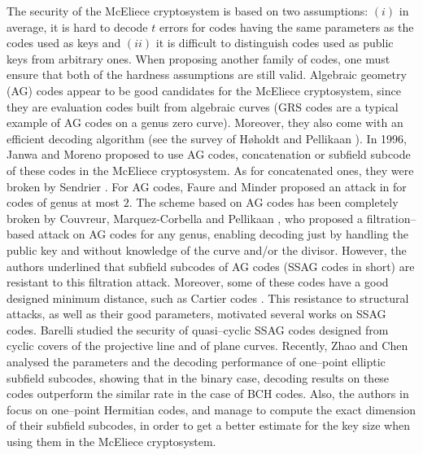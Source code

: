 \documentclass[a4paper]{amsart}
\theoremstyle{definition}
\theoremstyle{remark}
\begin{document}
The security of the McEliece cryptosystem is based on two assumptions: $(i)$ in average, it is hard to decode $t$ errors for codes having the same parameters as the codes used as keys and $(ii)$ it is difficult to distinguish codes used as public keys from arbitrary ones. When proposing another family of codes, one must ensure that both of the hardness assumptions are still valid.
Algebraic geometry (AG) codes appear to be good candidates for the McEliece cryptosystem, since they are evaluation codes built from algebraic curves (GRS codes are a typical example of AG codes on a genus zero curve). Moreover, they also come with an efficient decoding algorithm (see the survey of H\o holdt and Pellikaan \cite{HP95}).
In 1996, Janwa and Moreno \cite{JM96} proposed to use AG codes, concatenation or subfield subcode of these codes in the McEliece cryptosystem. As for concatenated ones, they were broken by Sendrier \cite{Sen94}. For AG codes, Faure and Minder proposed an attack in \cite{FM08,Min07,Fau09} for codes of genus at most $2$. The scheme based on AG codes has been completely broken by Couvreur, Marquez-Corbella and Pellikaan \cite{CMR17}, who proposed a filtration--based attack on AG codes for any genus, enabling decoding just by handling the public key and without knowledge of the curve and/or the divisor. However, the authors underlined that subfield subcodes of AG codes (SSAG codes in short) are resistant to this filtration attack. Moreover, some of these codes have a good designed minimum distance, such as Cartier codes \cite{Cou14}. This resistance to structural attacks, as well as their good parameters, motivated several works on SSAG codes. Barelli \cite{B18} studied the security of quasi--cyclic SSAG codes designed from cyclic covers of the projective line and of plane curves. Recently, Zhao and Chen \cite{ZC22} analysed the parameters and the decoding performance of one--point elliptic subfield subcodes, showing that in the binary case, decoding results on these codes outperform the similar rate in the case of BCH codes. Also, the authors in \cite{PJ14,EKN21} focus on one--point Hermitian codes, and manage to compute the exact dimension of their subfield subcodes, in order to get a better estimate for the key size when using them in the McEliece cryptosystem.
\end{document}
